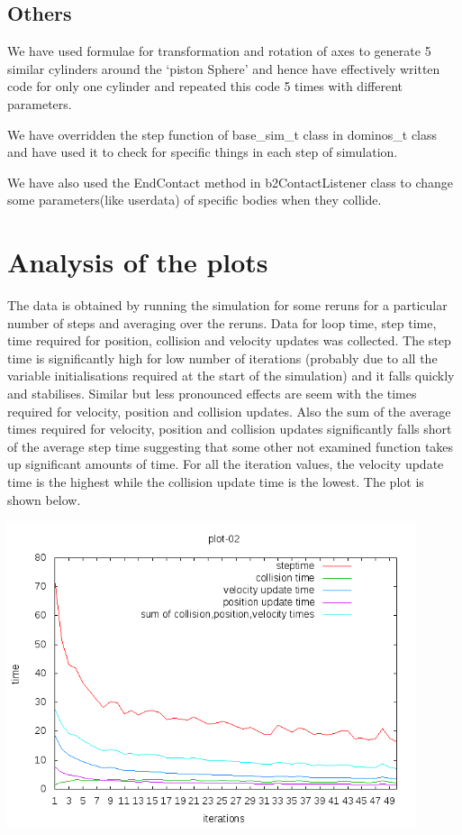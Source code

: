 \documentclass[11pt]{article}
\begin{document}
\subsection{Others}
We have used formulae for transformation and rotation of axes to generate 5 similar cylinders around the `piston Sphere' and hence have effectively written code for only one cylinder and repeated this code 5 times with different parameters.

We have overridden the step function of base\_sim\_t class in dominos\_t class and have used it to check for specific things in each step of simulation.

We have also used the EndContact method in b2ContactListener class to change some parameters(like userdata) of specific bodies when they collide.

\section{Analysis of the plots}
The data is obtained by running the simulation for some reruns for a particular number of steps and averaging over the reruns. Data for loop time, step time, time required for position, collision and velocity updates was collected. The step time is significantly high for low number of iterations (probably due to all the variable initialisations required at the start of the simulation) and it falls quickly and stabilises. Similar but less pronounced effects are seem with the times required for velocity, position and collision updates. Also the sum of the average times required for velocity, position and collision updates significantly falls short of the average step time suggesting that some other not examined function takes up significant amounts of time. For all the iteration values, the velocity update time is the highest while the collision update time is the lowest. The plot is shown below.

\begin{center}
	\includegraphics[width=12cm]{./images/plots/g04_plot02.png}
\end{center}
\end{document}
